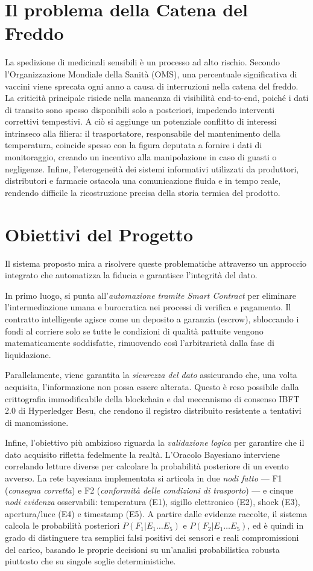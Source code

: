 \section{Il problema della Catena del Freddo}
La spedizione di medicinali sensibili è un processo ad alto rischio. Secondo l'Organizzazione Mondiale della Sanità (OMS), una percentuale significativa di vaccini viene sprecata ogni anno a causa di interruzioni nella catena del freddo.
La criticità principale risiede nella mancanza di visibilità end-to-end, poiché i dati di transito sono spesso disponibili solo a posteriori, impedendo interventi correttivi tempestivi. A ciò si aggiunge un potenziale conflitto di interessi intrinseco alla filiera: il trasportatore, responsabile del mantenimento della temperatura, coincide spesso con la figura deputata a fornire i dati di monitoraggio, creando un incentivo alla manipolazione in caso di guasti o negligenze. Infine, l'eterogeneità dei sistemi informativi utilizzati da produttori, distributori e farmacie ostacola una comunicazione fluida e in tempo reale, rendendo difficile la ricostruzione precisa della storia termica del prodotto.

\section{Obiettivi del Progetto}
Il sistema proposto mira a risolvere queste problematiche attraverso un approccio integrato che automatizza la fiducia e garantisce l'integrità del dato.

In primo luogo, si punta all'\emph{automazione tramite Smart Contract} per eliminare l'intermediazione umana e burocratica nei processi di verifica e pagamento. Il contratto intelligente agisce come un deposito a garanzia (escrow), sbloccando i fondi al corriere solo se tutte le condizioni di qualità pattuite vengono matematicamente soddisfatte, rimuovendo così l'arbitrarietà dalla fase di liquidazione.

Parallelamente, viene garantita la \emph{sicurezza del dato} assicurando che, una volta acquisita, l'informazione non possa essere alterata. Questo è reso possibile dalla crittografia immodificabile della blockchain e dal meccanismo di consenso IBFT 2.0 di Hyperledger Besu, che rendono il registro distribuito resistente a tentativi di manomissione.

Infine, l'obiettivo più ambizioso riguarda la \emph{validazione logica} per garantire che il dato acquisito rifletta fedelmente la realtà. L'Oracolo Bayesiano interviene correlando letture diverse per calcolare la probabilità posteriore di un evento avverso. La rete bayesiana implementata si articola in due \emph{nodi fatto} --- F1 (\emph{consegna corretta}) e F2 (\emph{conformità delle condizioni di trasporto}) --- e cinque \emph{nodi evidenza} osservabili: temperatura (E1), sigillo elettronico (E2), shock (E3), apertura/luce (E4) e timestamp (E5). A partire dalle evidenze raccolte, il sistema calcola le probabilità posteriori $P(F_1 | E_1 \ldots E_5)$ e $P(F_2 | E_1 \ldots E_5)$, ed è quindi in grado di distinguere tra semplici falsi positivi dei sensori e reali compromissioni del carico, basando le proprie decisioni su un'analisi probabilistica robusta piuttosto che su singole soglie deterministiche.
